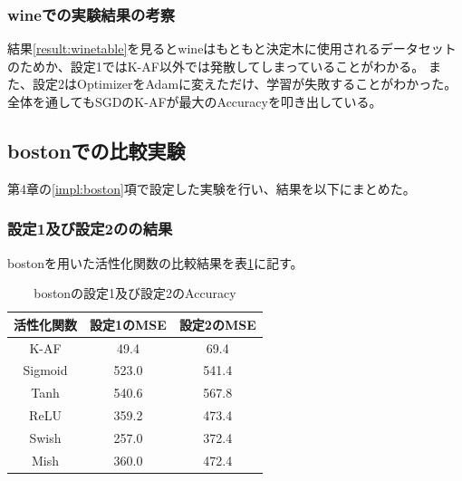 \subsubsection{wineでの実験結果の考察}
結果\ref{result:winetable}を見るとwineはもともと決定木に使用されるデータセットのためか、設定1ではK-AF以外では発散してしまっていることがわかる。
また、設定2はOptimizerをAdamに変えただけ、学習が失敗することがわかった。
全体を通してもSGDのK-AFが最大のAccuracyを叩き出している。







\subsection{bostonでの比較実験}
\label{ev:bostonでの比較実験}

第4章の\ref{impl:boston}項で設定した実験を行い、結果を以下にまとめた。
\subsubsection{設定1及び設定2のの結果}

bostonを用いた活性化関数の比較結果を表\ref{result:bostontable}に記す。


\begin{table}[htbp]
    \begin{center}
        \caption{bostonの設定1及び設定2のAccuracy}
        \label{result:bostontable}
        \vspace{2mm} 
        \begin{tabular}{|c|c|c|}
            \hline
            活性化関数              & 設定1のMSE &  設定2のMSE \\
            \hline
            K-AF            & 49.4 & 69.4 \\
            \hline
            Sigmoid            & 523.0 & 541.4 \\
            \hline
            Tanh            & 540.6 &  567.8 \\
            \hline
            ReLU        & 359.2 & 473.4 \\
            \hline
            Swish           & 257.0 & 372.4 \\
            \hline
            Mish           & 360.0 & 472.4 \\
            \hline
    
        \end{tabular}
    \end{center}
\end{table}


